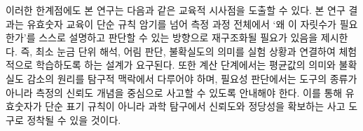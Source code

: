 이러한 한계점에도 본 연구는 다음과 같은 교육적 시사점을 도출할 수 있다.
%
본 연구 결과는 유효숫자 교육이 단순 규칙 암기를 넘어 측정 과정 전체에서
`왜 이 자릿수가 필요한가'를 스스로 설명하고 판단할 수 있는 방향으로
재구조화될 필요가 있음을 제시한다.
%
즉, 최소 눈금 단위 해석, 어림 판단, 불확실도의 의미를 실험 상황과 연결하여
체험적으로 학습하도록 하는 설계가 요구된다.
%
또한 계산 단계에서는 평균값의 의미와 불확실도 감소의 원리를 탐구적 맥락에서 다루어야 하며,
필요성 판단에서는 도구의 종류가 아니라 측정의 신뢰도 개념을 중심으로 사고할 수 있도록 안내해야 한다.
%
이를 통해 유효숫자가 단순 표기 규칙이 아니라 과학 탐구에서 신뢰도와 정당성을 확보하는
사고 도구로 정착될 수 있을 것이다.